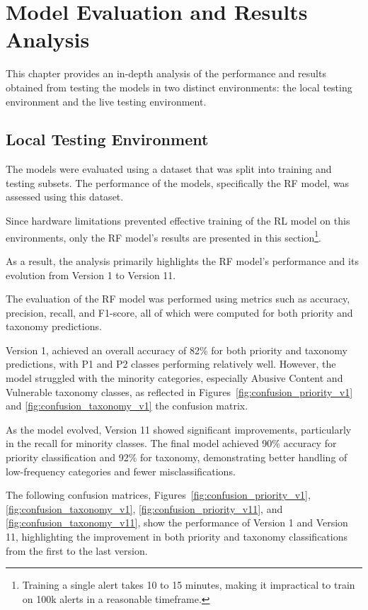 \chapter{Model Evaluation and Results Analysis}
\label{chap:Chapter4}

This chapter provides an in-depth analysis of the performance and results obtained from testing the models in two distinct environments: the local testing environment and the live testing environment.

\section{Local Testing Environment}

The models were evaluated using a dataset that was split into training and testing subsets. 
The performance of the models, specifically the RF model, was assessed using this dataset. 

Since hardware limitations prevented effective training of the RL model on this environments, only the RF model's results are presented in this section\footnote{Training a single alert takes 10 to 15 minutes, making it impractical to train on 100k alerts in a reasonable timeframe.}.

As a result, the analysis primarily highlights the RF model's performance and its evolution from Version 1 to Version 11.

The evaluation of the RF model was performed using metrics such as accuracy, precision, recall, and F1-score, all of which were computed for both priority and taxonomy predictions. 

Version 1, achieved an overall accuracy of 82\% for both priority and taxonomy predictions, with P1 and P2 classes performing relatively well. 
However, the model struggled with the minority categories, especially Abusive Content and Vulnerable taxonomy classes, as reflected in Figures~\ref{fig:confusion_priority_v1} and \ref{fig:confusion_taxonomy_v1} the confusion matrix.

As the model evolved, Version 11 showed significant improvements, particularly in the recall for minority classes. 
The final model achieved 90\% accuracy for priority classification and 92\% for taxonomy, demonstrating better handling of low-frequency categories and fewer misclassifications.

The following confusion matrices, Figures~\ref{fig:confusion_priority_v1}, \ref{fig:confusion_taxonomy_v1}, \ref{fig:confusion_priority_v11}, and \ref{fig:confusion_taxonomy_v11}, show the performance of Version 1 and Version 11, highlighting the improvement in both priority and taxonomy classifications from the first to the last version.

